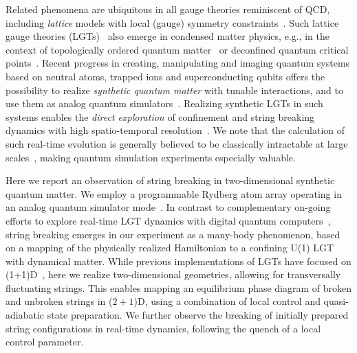 \documentclass[footinbib,a4paper,aps,superscriptaddress,twocolumn,preprintnumbers,amsmath,amssymb,nobalancelastpage,10pt,prl]{revtex4-2}
\begin{document}
Related phenomena are ubiquitous in all gauge theories reminiscent of QCD, including \emph{lattice} models with local (gauge) symmetry constraints~\cite{Hebenstreit_2013, Kuhn_2015, Pichler_2016, Verdel_2023}.
Such lattice gauge theories (LGTs)~\cite{Montvay_1997} also emerge in condensed matter physics, e.g., in the context of topologically ordered quantum matter~\cite{Sachdev_2019} or deconfined quantum critical points~\cite{Senthil_2004}. Recent progress in creating, manipulating and imaging quantum systems based on neutral atoms, trapped ions and superconducting qubits offers the possibility to realize \textit{synthetic quantum matter} with tunable interactions, and to use them as analog quantum simulators~\cite{Altman_2021}.
Realizing synthetic LGTs in such systems enables the \emph{direct exploration} of confinement and string breaking dynamics with high spatio-temporal resolution~\cite{Banerjee_2012, Wiese_2013, Zohar_2015, Banuls_2020, Aidelsburger_2022, Klco_2022, Di_Meglio_2024}. We note that the  calculation of such real-time evolution is generally believed to be classically intractable at large scales~\cite{Bauer2023}, making  quantum simulation experiments especially valuable. 

Here we report an observation of string breaking in
two-dimensional synthetic quantum matter. We employ
a programmable Rydberg atom array operating in an
analog quantum simulator mode~\cite{chen2023continuous,shaw2024benchmarking,Manovitz_2024,anand2024dual}. In contrast to
complementary on-going efforts to explore real-time LGT
dynamics with digital quantum computers~\cite{Google_2024}, string
breaking emerges in our experiment as a many-body phenomenon, based on a mapping of the physically realized Hamiltonian to a confining U(1) LGT with
dynamical matter. While previous implementations of
LGTs have focused on (1+1)D~\cite{Martinez_2016, Kclo_2018, Schweizer_2019, Kokail_2019, Mil_2020, Yang_2020, Zhou_2021, Nguyen_2021, Tan_2021, Frolian_2022, Mildenberger_2022, Meth_2023, De2024}, here we realize
two-dimensional geometries, allowing for transversally fluctuating strings. This enables mapping an equilibrium
phase diagram of broken and unbroken strings in ($2+1$)D, using a combination of local control and quasi-adiabatic state
preparation. We further observe the breaking of initially prepared string configurations
in real-time dynamics, following the quench of a local control parameter. 
\end{document}
